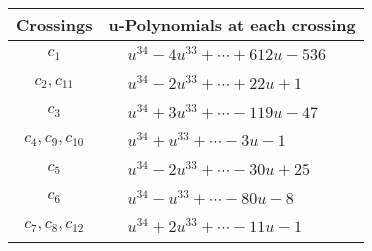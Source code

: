 \documentclass[1p]{elsarticle_modified}
\theoremstyle{definition}
\begin{document}
\begin{tabular}{m{50pt}|m{274pt}}
Crossings & \hspace{64pt}u-Polynomials at each crossing \\
\hline $$\begin{aligned}c_{1}\end{aligned}$$&$\begin{aligned}
&u^{34}-4 u^{33}+\cdots+612 u-536
\end{aligned}$\\
\hline $$\begin{aligned}c_{2},c_{11}\end{aligned}$$&$\begin{aligned}
&u^{34}-2 u^{33}+\cdots+22 u+1
\end{aligned}$\\
\hline $$\begin{aligned}c_{3}\end{aligned}$$&$\begin{aligned}
&u^{34}+3 u^{33}+\cdots-119 u-47
\end{aligned}$\\
\hline $$\begin{aligned}c_{4},c_{9},c_{10}\end{aligned}$$&$\begin{aligned}
&u^{34}+u^{33}+\cdots-3 u-1
\end{aligned}$\\
\hline $$\begin{aligned}c_{5}\end{aligned}$$&$\begin{aligned}
&u^{34}-2 u^{33}+\cdots-30 u+25
\end{aligned}$\\
\hline $$\begin{aligned}c_{6}\end{aligned}$$&$\begin{aligned}
&u^{34}- u^{33}+\cdots-80 u-8
\end{aligned}$\\
\hline $$\begin{aligned}c_{7},c_{8},c_{12}\end{aligned}$$&$\begin{aligned}
&u^{34}+2 u^{33}+\cdots-11 u-1
\end{aligned}$\\
\hline
\end{tabular}\\~\\
\newpage\renewcommand{\arraystretch}{1}
\end{document}
